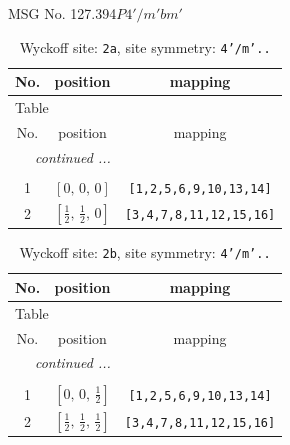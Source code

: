 \documentclass[fleqn,8pt]{jsarticle}
\begin{document}
\setcounter{MaxMatrixCols}{32}

\renewcommand{\tablename}{Table~}
\renewcommand{\figurename}{Figure~}
\begin{center}
\LARGE
MSG No. 127.394\quad$P4'/m'bm'$
\end{center}
\renewcommand{\arraystretch}{1.2}
\begin{longtable}{ccc}
\caption{Wyckoff site: {\tt 2a}, site symmetry: {\tt 4'/m'..}}
 \\
 \hline \hline
No. & position & mapping \\ \hline \endfirsthead

\multicolumn{2}{l}{\tablename\ \thetable{}} \\
 \hline \hline
No. & position & mapping \\ \hline \endhead

 \hline \hline
\multicolumn{2}{r}{\footnotesize\it continued ...} \\ \endfoot

 \hline \hline
\multicolumn{2}{r}{} \\ \endlastfoot

1 & $\left[ 0,\, 0,\, 0 \right]$ & {\tt [1,2,5,6,9,10,13,14]} \\ \hline
2 & $\left[ \frac{1}{2},\, \frac{1}{2},\, 0 \right]$ & {\tt [3,4,7,8,11,12,15,16]} \\
\end{longtable}
\renewcommand{\arraystretch}{1.2}
\begin{longtable}{ccc}
\caption{Wyckoff site: {\tt 2b}, site symmetry: {\tt 4'/m'..}}
 \\
 \hline \hline
No. & position & mapping \\ \hline \endfirsthead

\multicolumn{2}{l}{\tablename\ \thetable{}} \\
 \hline \hline
No. & position & mapping \\ \hline \endhead

 \hline \hline
\multicolumn{2}{r}{\footnotesize\it continued ...} \\ \endfoot

 \hline \hline
\multicolumn{2}{r}{} \\ \endlastfoot

1 & $\left[ 0,\, 0,\, \frac{1}{2} \right]$ & {\tt [1,2,5,6,9,10,13,14]} \\ \hline
2 & $\left[ \frac{1}{2},\, \frac{1}{2},\, \frac{1}{2} \right]$ & {\tt [3,4,7,8,11,12,15,16]} \\
\end{longtable}
\end{document}
